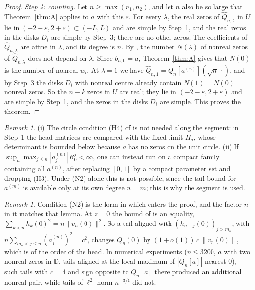 \documentclass[11pt]{amsart}
\theoremstyle{definition}
\theoremstyle{remark}
\newtheorem{remark}[theorem]{Remark}
\numberwithin{equation}{section}
\newcommand{\D}{\mathbb{D}}
\newcommand{\eps}{\varepsilon}
\begin{document}
\begin{proof}
\emph{Step 4: counting.} Let $n\ge\max(n_1,n_2)$, and let $n$ also be so large that Theorem~\ref{thm:A} applies to $a$ with this $\eps$. For every $\lambda$, the real zeros of $\widehat Q_{n,\lambda}$ in $U$ lie in $(-2-\eps,2+\eps)\subset(-L,L)$ and are simple by Step~1, and the real zeros in the disks $D_i$ are simple by Step~3; there are no other zeros. The coefficients of $\widehat Q_{n,\lambda}$ are affine in $\lambda$, and its degree is $n$. By \cite[Lemma~\ref{M-lem:constancy}]{Main}, the number $N(\lambda)$ of nonreal zeros of $\widehat Q_{n,\lambda}$ does not depend on $\lambda$. Since $b_{n,0}=a$, Theorem~\ref{thm:A} gives that $N(0)$ is the number of nonreal $w_i$. At $\lambda=1$ we have $\widehat Q_{n,1}=Q_n[a^{(n)}](\sqrt n\,\cdot)$, and by Step~3 the disks $D_i$ with nonreal centre already contain $N(1)=N(0)$ nonreal zeros. So the $n-k$ zeros in $U$ are real; they lie in $(-2-\eps,2+\eps)$ and are simple by Step~1, and the zeros in the disks $D_i$ are simple. This proves the theorem.
\end{proof}

\begin{remark}\label{rem:moving-segment}
(i) The circle condition (H4) of \cite[Hypothesis~\ref{M-hyp:H}]{Main} is not needed along the segment: in Step~1 the head matrices are compared with the fixed limit $H_a$, whose determinant is bounded below because $a$ has no zeros on the unit circle. (ii) If $\sup_n\max_{j\le n}|a^{(n)}_j|R_0^j<\infty$, one can instead run \cite[Propositions~{\ref{M-prop:bulk}} and~{\ref{M-prop:exterior}}]{Main} on a compact family containing all $a^{(n)}$, after replacing $[0,1]$ by a compact parameter set and dropping (H3). Under (N2) alone this is not possible, since the tail bound for $a^{(m)}$ is available only at its own degree $n=m$; this is why the segment is used.
\end{remark}

\begin{remark}\label{rem:moving-exponent}
Condition (N2) is the form in which \cite[Lemma~\ref{M-lem:cd}]{Main} enters the proof, and the factor $n$ in it matches that lemma. At $z=0$ the bound of \cite[Lemma~\ref{M-lem:cd}]{Main} is an equality, $\sum_{k<n}h_k(0)^2=n\|v_n(0)\|^2$. So a tail aligned with $(h_{n-j}(0))_{j>m_n}$, with $n\sum_{m_n<j\le n}(a^{(n)}_j)^2=c^2$, changes $Q_n(0)$ by $(1+o(1))\,c\,\|v_n(0)\|$, which is of the order of the head. In numerical experiments ($n\le3200$, $a$ with two nonreal zeros in $\D$, tails aligned at the local maximum of $|Q_n[a]|$ nearest $0$), such tails with $c=4$ and sign opposite to $Q_n[a]$ there produced an additional nonreal pair, while tails of $\ell^2$-norm $n^{-3/4}$ did not.
\end{remark}
\end{document}
